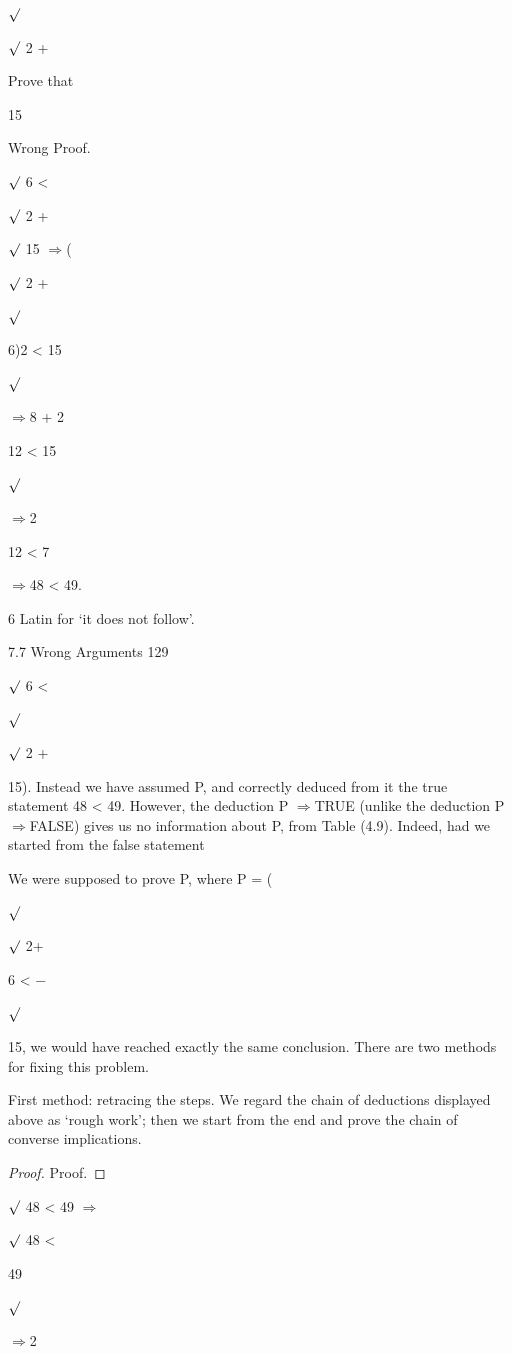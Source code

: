\documentclass[11pt]{article}
\theoremstyle{plain}
\theoremstyle{definition}
\begin{document}
$\surd$

$\surd$ 2 +

Prove that

15

Wrong Proof.

$\surd$ 6 <

$\surd$ 2 +

$\surd$ 15 $\Rightarrow$(

$\surd$ 2 +

$\surd$

6)2 < 15

$\surd$

$\Rightarrow$8 + 2

12 < 15

$\surd$

$\Rightarrow$2

12 < 7

$\Rightarrow$48 < 49. 

6 Latin for `it does not follow'.

7.7 Wrong Arguments 129

$\surd$ 6 <

$\surd$

$\surd$ 2 +

15). Instead we have assumed P, and correctly deduced from it the true statement 48 < 49. However, the deduction P $\Rightarrow$TRUE (unlike the deduction P $\Rightarrow$FALSE) gives us no information about P, from Table (4.9). Indeed, had we started from the false statement

We were supposed to prove P, where P = (

$\surd$

$\surd$ 2+

6 < $-$

$\surd$

15, we would have reached exactly the same conclusion. There are two methods for fixing this problem.

First method: retracing the steps. We regard the chain of deductions displayed above as `rough work'; then we start from the end and prove the chain of converse implications.

\begin{proof}
Proof.
\end{proof}

$\surd$ 48 < 49 $\Rightarrow$

$\surd$ 48 <

49

$\surd$

$\Rightarrow$2
\end{document}
